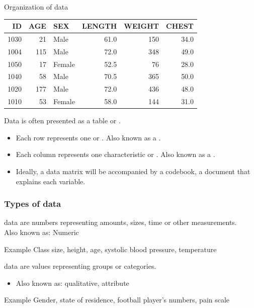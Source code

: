 \documentclass[xcolor=table, aspectratio=169, bigger, handout]{beamer}
\begin{document}
\begin{frame}{Organization of data}

\begin{table}[ht]
\centering
\begin{tabular}{rrlrrr}
  \hline
ID & AGE & SEX & LENGTH & WEIGHT & CHEST \\ 
  \hline
1030 & 21 & Male & 61.0 & 150 & 34.0 \\ 
  1004 & 115 & Male & 72.0 & 348 & 49.0 \\ 
  1050 & 17 & Female & 52.5 & 76 & 28.0 \\ 
  1040 & 58 & Male & 70.5 & 365 & 50.0 \\ 
  1020 & 177 & Male & 72.0 & 436 & 48.0 \\ 
  1010 & 53 & Female & 58.0 & 144 & 31.0 \\ 
   \hline
\end{tabular}
\end{table}

\begin{block}{}
Data is often presented as a table or .
\begin{itemize}
\pause\item Each row represents one  or . Also known as a .
\pause\item Each column represents one characteristic or . Also known as a .
\pause\item Ideally, a data matrix will be accompanied by a codebook, a document that explains each variable.
\end{itemize}
\end{block}

\end{frame}


\begin{frame}
\frametitle{Types of data}

\begin{block}{}
 data are numbers representing amounts, sizes, time or other measurements.\\
Also known as: Numeric
\end{block}

\begin{exampleblock}{Example}
Class size, height, age, systolic blood pressure, temperature
\end{exampleblock}

\pause

\begin{block}{}
 data are values representing groups or categories.
\begin{itemize}
\item Also known as: qualitative, attribute
\end{itemize}
\end{block}

\begin{exampleblock}{Example}
Gender, state of residence, football player's numbers, pain scale
\end{exampleblock}

\end{frame}
\end{document}
